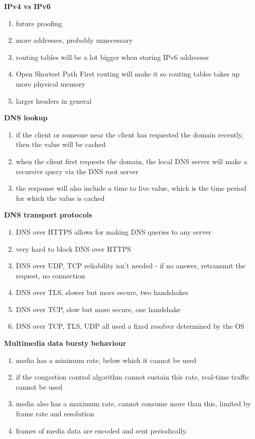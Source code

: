 \documentclass{article}
\begin{document}
\textbf{IPv4 vs IPv6}
\begin{enumerate}
    \item future proofing
    \item more addresses, probably unnecessary
    \item routing tables will be a lot bigger when storing IPv6 addresses
    \item Open Shortest Path First routing will make it so routing tables takes up more physical memory
    \item larger headers in general
\end{enumerate}


\textbf{DNS lookup}
\begin{enumerate}
    \item if the client or someone near the client has requested the domain recently, then the value will be cached
    \item when the client first requests the domain, the local DNS server will make a recursive query via the DNS root server
    \item the response will also include a time to live value, which is the time period for which the value is cached
\end{enumerate}


\textbf{DNS transport protocols}
\begin{enumerate}
    \item DNS over HTTPS allows for making DNS queries to any server
    \item very hard to block DNS over HTTPS
    \item DNS over UDP, TCP reliability isn't needed {-} if no answer, retransmit the request, no connection
    \item DNS over TLS, slower but more secure, two handshakes
    \item DNS over TCP, slow but more secure, one handshake
    \item DNS over TCP, TLS, UDP all used a fixed resolver determined by the OS
\end{enumerate}


\textbf{Multimedia data bursty behaviour}
\begin{enumerate}
    \item media has a minimum rate, below which it cannot be used
    \item if the congestion control algorithm cannot sustain this rate, real-time traffic cannot be used
    \item media also has a maximum rate, cannot consume more than this, limited by frame rate and resolution
    \item frames of media data are encoded and sent periodically.
\end{enumerate}
\end{document}
